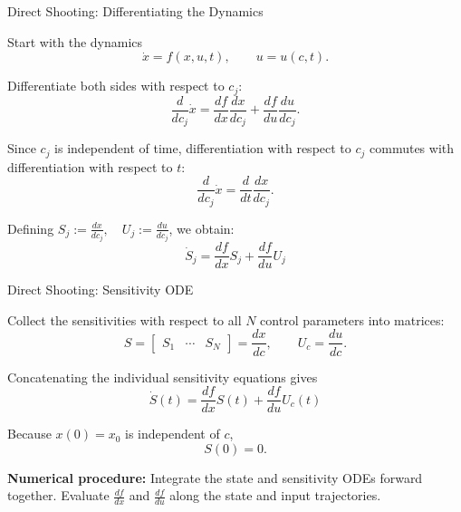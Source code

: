 \documentclass{beamer}
\begin{document}
\begin{frame}{Direct Shooting: Differentiating the Dynamics}
	\begin{flushleft}
		Start with the dynamics
		\[
		\dot{x} = f(x,u,t),
		\qquad u=u(c,t).
		\]
		
		Differentiate both sides with respect to $c_j$:
		\[
		\frac{d}{dc_j}\dot{x}
		=
		\frac{df}{dx}\frac{dx}{dc_j}
		+
		\frac{df}{du}\frac{du}{dc_j}.
		\]
		
		Since $c_j$ is independent of time, differentiation
		with respect to $c_j$ commutes with differentiation
		with respect to $t$:
		\[
		\frac{d}{dc_j}\dot{x}
		=
		\frac{d}{dt}\frac{dx}{dc_j}.
		\]
		
		Defining $S_j := \frac{dx}{dc_j},
		\quad
		U_j := \frac{du}{dc_j}$, 
		we obtain:
		\[
		\boxed{
			\dot{S}_j
			=
			\frac{df}{dx}S_j
			+
			\frac{df}{du}U_j
		}
		\]
	\end{flushleft}
\end{frame}

\begin{frame}{Direct Shooting: Sensitivity ODE}
	\begin{flushleft}
		Collect the sensitivities with respect to all $N$
		control parameters into matrices:
		\[
		S =
		\begin{bmatrix}
			S_1 & \cdots & S_N
		\end{bmatrix}
		=
		\frac{dx}{dc},
		\qquad
		U_c = \frac{du}{dc}.
		\]
		
		Concatenating the individual sensitivity equations gives
		\[
		\boxed{
			\dot{S}(t)
			=
			\frac{df}{dx}S(t)
			+
			\frac{df}{du}U_c(t)
		}
		\]
		
		\bigskip
		
		Because $x(0)=x_0$ is independent of $c$,
		\[
		\boxed{S(0)=0.}
		\]
		
		\textbf{Numerical procedure:} Integrate the state and
		sensitivity ODEs forward together. Evaluate $\frac{df}{dx}$
		and $\frac{df}{du}$ along the state and input trajectories.
	\end{flushleft}
\end{frame}
\end{document}
